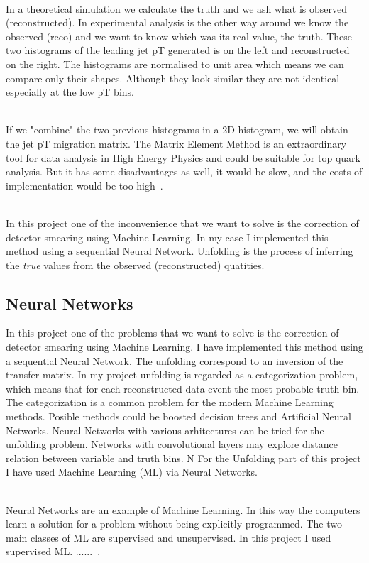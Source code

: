 \documentclass[a4paper,11pt,twoside]{article}
\begin{document}
\ \\In a theoretical simulation we calculate the truth and we ash what is observed (reconstructed). In experimental analysis is the other way around we know the observed (reco) and we want to know which was its real value, the truth. These two histograms of the leading jet pT generated is on the left and reconstructed on the right. The histograms are normalised to unit area which means we can compare only their shapes. Although they look similar they are not identical especially at the low pT bins.  

\ \\If we "combine" the two previous histograms in a 2D histogram, we will obtain the jet pT migration matrix. The Matrix Element Method is an extraordinary tool for data analysis in High Energy Physics and could be suitable for top quark analysis. But it has some disadvantages as well, it would be slow, and the costs of implementation would be too high~\cite{bendavid}.

\ \\ In this project one of the inconvenience that we want to solve is the correction of detector smearing using Machine Learning. In my case I implemented this method using a sequential Neural Network. Unfolding is the process of inferring the \emph{true} values from the observed (reconstructed) quatities. 

\subsection{Neural Networks}

In this project one of the problems that we want to solve is the correction of detector smearing using Machine Learning. I have implemented this method using a sequential Neural Network. The unfolding correspond to an inversion of the transfer matrix. In my project unfolding is regarded as a categorization problem, which means that for each reconstructed data event the most probable truth bin. The categorization is a common problem for the modern Machine Learning methods. Posible methods could be boosted decision trees and Artificial Neural Networks. Neural Networks with various arhitectures can be tried for the unfolding problem. Networks with convolutional layers may explore distance relation between variable and truth bins.  N For the Unfolding part of this project I have used Machine Learning (ML) via Neural Networks.

\ \\ Neural Networks are an example of Machine Learning. In this way the computers learn a solution for a problem without being explicitly programmed. The two main classes of ML are supervised and unsupervised. 
In this project I used supervised ML. ......~\cite{AndrewNg}.
\end{document}
